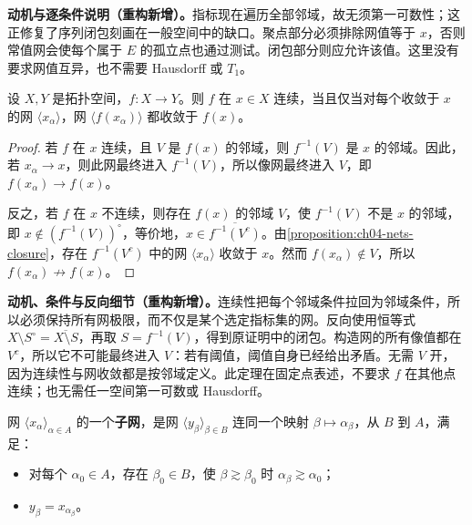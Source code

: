 \documentclass[../../main.tex]{subfiles}%
\begin{document}
\begin{remark}
\textbf{动机与逐条件说明（重构新增）。}指标现在遍历全部邻域，故无须第一可数性；这正修复了序列闭包刻画在一般空间中的缺口。聚点部分必须排除网值等于 $x$，否则常值网会使每个属于 $E$ 的孤立点也通过测试。闭包部分则应允许该值。这里没有要求网值互异，也不需要 Hausdorff 或 $T_1$。
\end{remark}
\begin{proposition}\label{proposition:ch04-net-continuity}
设 $X,Y$ 是拓扑空间，$f:X\to Y$。则 $f$ 在 $x\in X$ 连续，当且仅当对每个收敛于 $x$ 的网 $\langle x_\alpha\rangle$，网 $\langle f(x_\alpha)\rangle$ 都收敛于 $f(x)$。
\end{proposition}
\begin{proof}
若 $f$ 在 $x$ 连续，且 $V$ 是 $f(x)$ 的邻域，则 $f^{-1}(V)$ 是 $x$ 的邻域。因此，若 $x_\alpha\to x$，则此网最终进入 $f^{-1}(V)$，所以像网最终进入 $V$，即 $f(x_\alpha)\to f(x)$。

反之，若 $f$ 在 $x$ 不连续，则存在 $f(x)$ 的邻域 $V$，使 $f^{-1}(V)$ 不是 $x$ 的邻域，即 $x\notin(f^{-1}(V))^\circ$，等价地，$x\in\overline{f^{-1}(V^c)}$。由\cref{proposition:ch04-nets-closure}，存在 $f^{-1}(V^c)$ 中的网 $\langle x_\alpha\rangle$ 收敛于 $x$。然而 $f(x_\alpha)\notin V$，所以 $f(x_\alpha)\not\to f(x)$。
\end{proof}
\begin{remark}
\textbf{动机、条件与反向细节（重构新增）。}连续性把每个邻域条件拉回为邻域条件，所以必须保持所有网极限，而不仅是某个选定指标集的网。反向使用恒等式 $X\setminus S^\circ=\overline{X\setminus S}$，再取 $S=f^{-1}(V)$，得到原证明中的闭包。构造网的所有像值都在 $V^c$，所以它不可能最终进入 $V$：若有阈值，阈值自身已经给出矛盾。无需 $V$ 开，因为连续性与网收敛都是按邻域定义。此定理在固定点表述，不要求 $f$ 在其他点连续；也无需任一空间第一可数或 Hausdorff。
\end{remark}
\begin{definition}[子网]\label{definition:ch04-subnet}
网 $\langle x_\alpha\rangle_{\alpha\in A}$ 的一个\textbf{子网}，是网 $\langle y_\beta\rangle_{\beta\in B}$ 连同一个映射 $\beta\mapsto\alpha_\beta$，从 $B$ 到 $A$，满足：
\begin{itemize}
\item 对每个 $\alpha_0\in A$，存在 $\beta_0\in B$，使 $\beta\gtrsim\beta_0$ 时 $\alpha_\beta\gtrsim\alpha_0$；
\item $y_\beta=x_{\alpha_\beta}$。
\end{itemize}
\end{definition}
\end{document}
